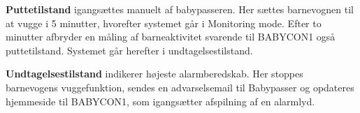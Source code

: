 \textbf{Puttetilstand} igangsættes manuelt af babypasseren. Her sættes barnevognen til at vugge i 5 minutter, hvorefter systemet går i Monitoring mode. Efter to minutter afbryder en måling af barneaktivitet svarende til BABYCON1 også puttetilstand. Systemet går herefter i undtagelsestilstand.

\textbf{Undtagelsestilstand} indikerer højeste alarmberedskab. Her stoppes barnevogens vuggefunktion, sendes en advarselsemail til Babypasser og opdateres hjemmeside til BABYCON1, som igangsætter afspilning af en alarmlyd. 

